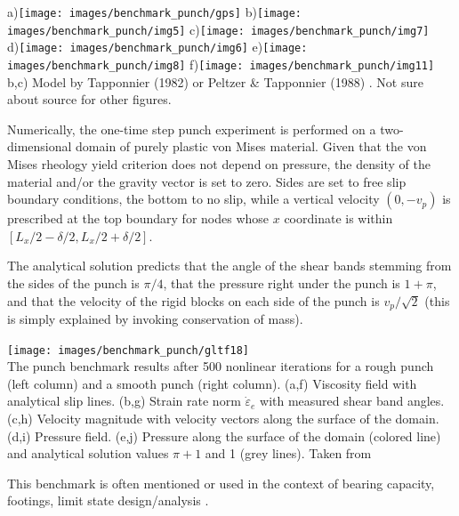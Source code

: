 \begin{center}
a)\texttt{[image: images/benchmark\_punch/gps]}
b)\texttt{[image: images/benchmark\_punch/img5]}
c)\texttt{[image: images/benchmark\_punch/img7]}\\
d)\texttt{[image: images/benchmark\_punch/img6]}
e)\texttt{[image: images/benchmark\_punch/img8]}
f)\texttt{[image: images/benchmark\_punch/img11]}\\
{\captionfont b,c) Model by Tapponnier \etal (1982) \cite{tapl82} or 
Peltzer \& Tapponnier (1988) \cite{peta88}. Not sure about source for other figures.}
\end{center}


 
Numerically, the one-time step punch experiment is performed on a two-dimensional
domain of purely plastic von Mises material. 
Given that the von Mises rheology yield criterion does not depend on pressure, the density of the material and/or the gravity vector is set to zero. Sides are set to free slip boundary conditions, the bottom to no slip, while a vertical velocity $(0,-v_p)$ is prescribed at the top boundary for nodes whose $x$ coordinate is within $[L_x/2-\delta/2,L_x/2+\delta/2]$. 

The analytical solution predicts that the angle of the shear bands stemming from the sides of the punch 
is $\pi/4$, that the pressure right under the punch is $1+\pi$, 
and that the velocity of the rigid blocks on each side of the punch is $v_p/\sqrt{2}$ 
(this is simply explained by invoking conservation of mass).


\begin{center}
\texttt{[image: images/benchmark\_punch/gltf18]}\\
{\captionfont The punch benchmark results after 500 nonlinear iterations for a rough punch (left column) 
and a smooth punch (right column). (a,f) Viscosity field with analytical slip lines. 
(b,g) Strain rate norm $\dot\varepsilon_e$ with measured shear band angles. 
(c,h) Velocity magnitude with velocity vectors along the surface of the domain.
(d,i) Pressure field. (e,j) Pressure along the surface of the domain (colored line) and analytical 
solution values $\pi + 1$ and 1 (grey lines). Taken from \cite{gltf18}}
\end{center}

\begin{remark}
This benchmark is often mentioned or used in the context of bearing capacity, footings, 
limit state design/analysis \cite{mich01,zhll03,gour04,gork06,lesk05,shls03}.
\end{remark}


